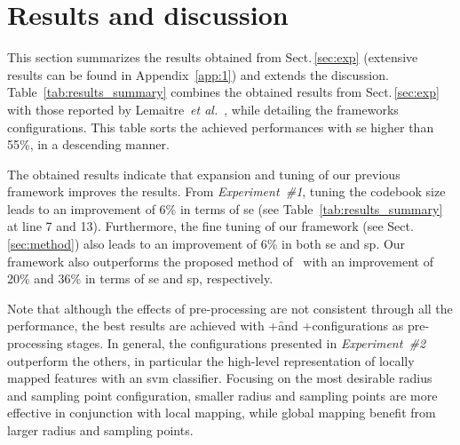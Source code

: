 
\section{Results and discussion}
\label{sec:res-dis}
This section summarizes the results obtained from Sect.\,\ref{sec:exp} (extensive results can be found in Appendix~\ref{app:1}) and extends the discussion.
Table~\ref{tab:results_summary} combines the obtained results from Sect.\,\ref{sec:exp} with those reported by Lemaitre~\emph{et al.}~\cite{Lemaintre2015miccaiOCT}, while detailing the frameworks configurations.
This table sorts the achieved performances with \ac{se} higher than 55\%, in a descending manner.

The obtained results indicate that expansion and tuning of our previous framework improves the results.
From \emph{Experiment~\#1}, tuning the codebook size leads to an improvement of 6\% in terms of \ac{se} (see Table~\ref{tab:results_summary} at line 7 and 13).
Furthermore, the fine tuning of our framework (see Sect.\,\ref{sec:method}) also leads to an improvement of 6\% in both \ac{se} and \ac{sp}.
Our framework also outperforms the proposed method of~\cite{Venhuizen2015} with an improvement of 20\% and 36\% in terms of \ac{se} and \ac{sp}, respectively.

Note that although the effects of pre-processing are not consistent through all the performance, the best results are achieved with \nlm+\f and \nlm+\fa configurations as pre-processing stages.
In general, the configurations presented in \emph{Experiment~\#2} outperform the others, in particular the high-level representation of locally mapped features with an \ac{svm} classifier.  
Focusing on the most desirable radius and sampling point configuration, smaller radius and sampling points are more effective in conjunction with local mapping, while global mapping benefit from larger radius and sampling points.

